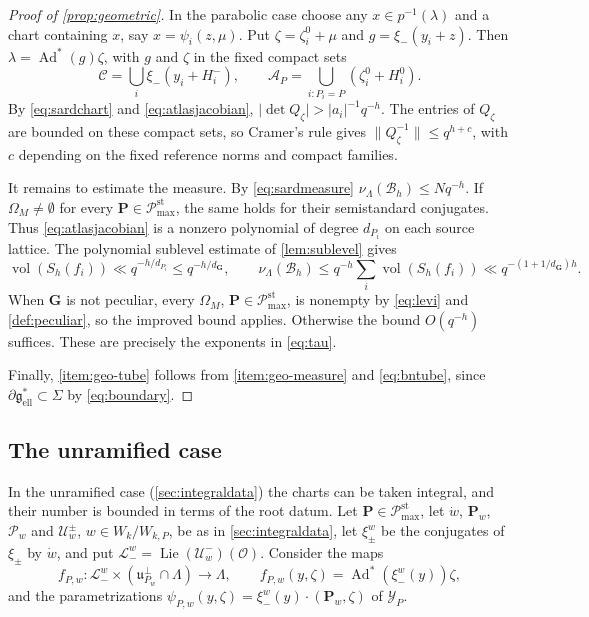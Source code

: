 \documentclass[11pt,reqno]{amsart}
\numberwithin{equation}{section}
\theoremstyle{plain}
\theoremstyle{definition}
\theoremstyle{remark}
\theoremstyle{plain}
\newcommand{\OO}{\mathcal{O}}    %
\newcommand{\Lat}{\mathcal{L}}   %
\newcommand{\dLat}{\Lambda}      %
\newcommand{\bG}{\mathbf{G}}     %
\newcommand{\bP}{\mathbf{P}}     %
\newcommand{\g}{\mathfrak{g}}    %
\newcommand{\gd}{\mathfrak{g}^*} %
\newcommand{\uu}{\mathfrak{u}}   %
\newcommand{\Ell}[2][]{#2_{#1\mathrm{ell}}}   %
\newcommand{\Bad}{\mathcal{B}}   %
\newcommand{\Pc}{\mathscr{P}^{\mathrm{st}}_{\mathrm{max}}}    %
\newcommand{\cP}{\mathcal{P}}                   %
\newcommand{\cU}{\mathcal{U}}                   %
\newcommand{\abs}[1]{\lvert#1\rvert}
\newcommand{\norm}[1]{\lVert#1\rVert}
\DeclareMathOperator{\vol}{vol}
\DeclareMathOperator{\Ad}{Ad}
\DeclareMathOperator{\Lie}{Lie}
\newcommand{\peculiar}{peculiar}
\newcommand{\dG}{d_{\bG}}
\newcommand{\lf}{\lambda}
\newcommand{\nf}{\zeta}
\newcommand{\Inc}{\mathcal{Y}}
\newcommand{\Crv}{\Sigma}
\begin{document}
\begin{proof}[Proof of \cref{prop:geometric}]
In the parabolic case choose any $x\in p^{-1}(\lf)$ and a chart
containing $x$, say $x=\psi_i(z,\mu)$. Put
$\nf=\nf_i^0+\mu$ and $g=\xi_-(y_i+z)$. Then
$\lf=\Ad^*(g)\nf$, with $g$ and $\nf$ in the fixed compact sets
\[
\mathcal C=\bigcup_i\xi_-(y_i+H_i^-),\qquad
\mathcal A_P=\bigcup_{i:P_i=P}(\nf_i^0+H_i^0).
\]
By \eqref{eq:sardchart} and \eqref{eq:atlasjacobian},
$\abs{\det Q_\nf}>\abs{a_i}^{-1}q^{-h}$.
The entries of $Q_\nf$ are bounded on these compact sets, so Cramer's
rule gives $\norm{Q_\nf^{-1}}\le q^{h+c}$, with $c$ depending on
the fixed reference norms and compact families.

It remains to estimate the measure.
By \eqref{eq:sardmeasure} $\nu_{\dLat}(\Bad_h)\le Nq^{-h}$.
If $\Omega_M\ne\emptyset$ for every $\bP\in\Pc$, the same holds for
their semistandard conjugates. Thus \eqref{eq:atlasjacobian} is a nonzero
polynomial of degree $d_{P_i}$ on each source lattice. The polynomial
sublevel estimate of \cref{lem:sublevel} gives
\[
\vol(S_h(f_i))\ll q^{-h/d_{P_i}}\le q^{-h/\dG{}},
\qquad
\nu_{\dLat}(\Bad_h)\le q^{-h}\sum_i\vol(S_h(f_i))
\ll q^{-(1+1/\dG{})h}.
\]
When $\bG$ is not \peculiar{}, every $\Omega_M$, $\bP\in\Pc$, is nonempty by
\eqref{eq:levi} and \cref{def:peculiar}, so the improved bound applies.
Otherwise the bound $O(q^{-h})$ suffices.
These are precisely the exponents in \eqref{eq:tau}.

Finally, \cref{item:geo-tube} follows from \cref{item:geo-measure} and
\eqref{eq:bntube}, since $\partial\Ell{\gd}\subset\Crv$ by
\eqref{eq:boundary}.
\end{proof}

\subsection{The unramified case}\label{sec:integralatlas}
In the unramified case (\cref{sec:integraldata}) the charts can be taken
integral, and their number is bounded in terms of the root datum. Let
$\bP\in\Pc$, let $\dot w$, $\bP_w$, $\cP_w$ and $\cU^\pm_w$,
$w\in W_k/W_{k,P}$, be as in \cref{sec:integraldata}, let $\xi^w_\pm$ be the
conjugates of $\xi_\pm$ by $\dot w$, and put
$\Lat^w_-=\Lie(\cU^-_w)(\OO)$. Consider the maps
\begin{equation}\label{eq:integralchart}
f_{P,w}:\Lat^w_-\times(\uu_{P_w}^\perp\cap \dLat)\to \dLat,\qquad
f_{P,w}(y,\nf)=\Ad^*(\xi^w_-(y))\nf,
\end{equation}
and the parametrizations $\psi_{P,w}(y,\nf)=\xi^w_-(y)\cdot(\bP_w,\nf)$ of
$\Inc_P$.
\end{document}
